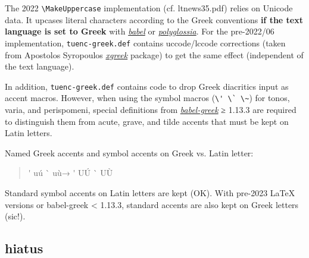 \documentclass[a4paper]{scrartcl}
\newcommand{\Greek}{
  \ifdefined\extrasgreek
    \selectlanguage{greek}
  \fi
}
\newcommand{\pkgref}[1]{\emph{\href{https://ctan.org/pkg/#1}{#1}}}
\begin{document}
The 2022 \verb|\MakeUppercase| implementation
(cf. \textsf{ltnews35.pdf}) relies on Unicode data.
It upcases literal characters according to the Greek conventions
\textbf{if the text language is set to Greek} with \pkgref{babel}
or \pkgref{polyglossia}.
For the pre-2022/06 implementation, \texttt{tuenc-greek.def} contains
uccode/lccode corrections (taken from Apostolos Syropoulos \pkgref{xgreek}
package) to get the same effect (independent of the text language).

In addition, \texttt{tuenc-greek.def} contains code to drop Greek diacritics
input as accent macros.
However, when using the symbol macros (\verb|\' \` \~|) for tonos, varia,
and perispomeni, special definitions from \pkgref{babel-greek} ≥ 1.13.3 are
required to distinguish them from acute, grave, and tilde accents that must
be kept on Latin letters.

Named Greek accents and symbol accents on Greek vs. Latin letter:
\begin{quote}
  \Greek
  \newcommand{\sample}{
   \acctonos\textupsilon\'\textupsilon{}  \acctonos u\'u
   \accvaria\textupsilon\`\textupsilon{}  \accvaria u\`u}
  \sample → \MakeUppercase{\sample}
\end{quote}
Standard symbol accents on Latin letters are kept (OK). With pre-2023 LaTeX
versions or babel-greek < 1.13.3, standard accents are also kept on Greek
letters (sic!).


\subsection{hiatus}
\end{document}

